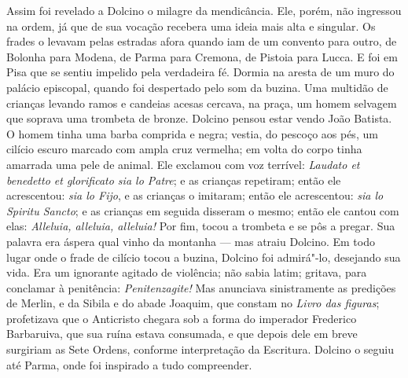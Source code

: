 Assim foi revelado a Dolcino o milagre da mendicância. Ele, porém, não
ingressou na ordem, já que de sua vocação recebera uma ideia mais alta e
singular. Os frades o levavam pelas estradas afora quando iam de um
convento para outro, de Bolonha para Modena, de Parma para Cremona, de
Pistoia para Lucca. E foi em Pisa que se sentiu impelido pela verdadeira
fé. Dormia na aresta de um muro do palácio episcopal, quando foi
despertado pelo som da buzina. Uma multidão de crianças levando ramos e
candeias acesas cercava, na praça, um homem selvagem que soprava uma
trombeta de bronze. Dolcino pensou estar vendo João Batista. O homem tinha
uma barba comprida e negra; vestia, do pescoço aos pés, um cilício escuro
marcado com ampla cruz vermelha; em volta do corpo tinha amarrada uma pele
de animal. Ele exclamou com voz terrível: \textit{Laudato et benedetto et
glorificato sia lo Patre}; e as crianças repetiram; então ele acrescentou:
\textit{sia lo Fijo}, e as crianças o imitaram; então ele acrescentou:
\textit{sia lo Spiritu Sancto}; e as crianças em seguida disseram o mesmo;
então ele cantou com elas: \textit{Alleluia, alleluia, alleluia!} Por fim,
tocou a trombeta e se pôs a pregar. Sua palavra era áspera qual vinho da
montanha --- mas atraiu Dolcino. Em todo lugar onde o frade de cilício tocou
a buzina, Dolcino foi admirá"-lo, desejando sua vida. Era um ignorante
agitado de violência; não sabia latim; gritava, para conclamar à
penitência: \textit{Penitenzagite!} Mas anunciava sinistramente as
predições de Merlin, e da Sibila e do abade Joaquim, que constam no
\textit{Livro das figuras}; profetizava que o Anticristo chegara sob a
forma do imperador Frederico Barbaruiva, que sua ruína estava consumada, e
que depois dele em breve surgiriam as Sete Ordens, conforme interpretação
da Escritura. Dolcino o seguiu até Parma, onde foi inspirado a tudo
compreender.

